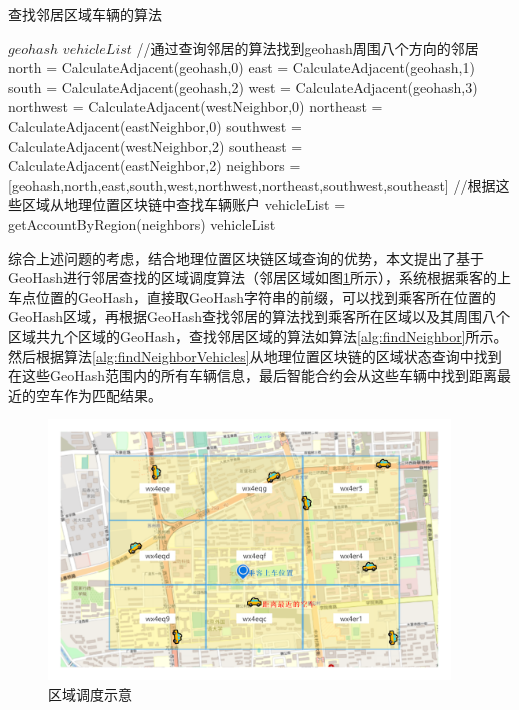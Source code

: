 \begin{algorithm}[h]
  \caption{查找邻居区域车辆的算法}
  \label{alg:findNeighborVehicles}
  \begin{algorithmic}[1]
  \REQUIRE $geohash$
  \ENSURE $vehicleList$
  \STATE //通过查询邻居的算法找到geohash周围八个方向的邻居
  \STATE north = CalculateAdjacent(geohash,0)
  \STATE east = CalculateAdjacent(geohash,1)
  \STATE south = CalculateAdjacent(geohash,2)
  \STATE west = CalculateAdjacent(geohash,3)
  \STATE northwest = CalculateAdjacent(westNeighbor,0)
  \STATE northeast = CalculateAdjacent(eastNeighbor,0)
  \STATE southwest = CalculateAdjacent(westNeighbor,2)
  \STATE southeast = CalculateAdjacent(eastNeighbor,2)
  \STATE neighbors = [geohash,north,east,south,west,northwest,northeast,southwest,southeast]
  \STATE //根据这些区域从地理位置区块链中查找车辆账户
  \STATE vehicleList = getAccountByRegion(neighbors)
  \RETURN vehicleList
  \end{algorithmic}
\end{algorithm}

综合上述问题的考虑，结合地理位置区块链区域查询的优势，本文提出了基于GeoHash进行邻居查找的区域调度算法（邻居区域如图\ref{fig:regionManage}所示），系统根据乘客的上车点位置的GeoHash，直接取GeoHash字符串的前缀，可以找到乘客所在位置的GeoHash区域，再根据GeoHash查找邻居的算法找到乘客所在区域以及其周围八个区域共九个区域的GeoHash，查找邻居区域的算法如算法\ref{alg:findNeighbor}所示。然后根据算法\ref{alg:findNeighborVehicles}从地理位置区块链的区域状态查询中找到在这些GeoHash范围内的所有车辆信息，最后智能合约会从这些车辆中找到距离最近的空车作为匹配结果。

\begin{figure}[h]
  \centering
  \includegraphics[width=0.95\textwidth]{figures/区域调度}
  \caption{区域调度示意}\label{fig:regionManage}
\end{figure}

